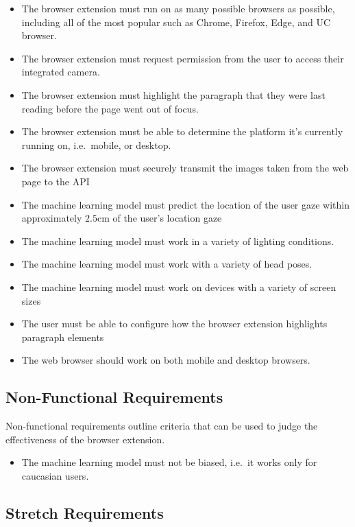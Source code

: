 \documentclass{report}
\begin{document}
\begin{itemize}
    \item The browser extension must run on as many possible browsers as possible, including all of the most popular such as Chrome, Firefox, Edge, and UC browser. 
    \item The browser extension must request permission from the user to access their integrated camera.
    \item The browser extension must highlight the paragraph that they were last reading before the page went out of focus. 
    \item The browser extension must be able to determine the platform it's currently running on, i.e.~mobile, or desktop. 
    \item The browser extension must securely transmit the images taken from the web page to the API 
    \item The machine learning model must predict the location of the user gaze within approximately \(2.5\text{cm}\) of the user's location gaze 
    \item The machine learning model must work in a variety of lighting conditions.
    \item The machine learning model must work with a variety of head poses. 
    \item The machine learning model must work on devices with a variety of screen sizes 
    \item The user must be able to configure how the browser extension highlights paragraph elements 
    \item The web browser should work on both mobile and desktop browsers. 
\end{itemize}

\subsection{Non-Functional Requirements}

Non-functional requirements outline criteria that can be used to judge the effectiveness of the browser extension. 

\begin{itemize}
    \item The machine learning model must not be biased, i.e.~it works only for caucasian users. 
\end{itemize}

\subsection{Stretch Requirements}\label{ssec:stretch}
\end{document}
